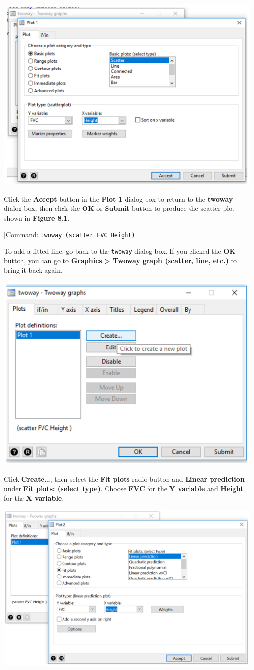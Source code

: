 \documentclass[
]{memoir}
\begin{document}
\includegraphics[width=0.66\linewidth]{img/mod08/stata/twoway-2}

Click the \textbf{Accept} button in the \textbf{Plot 1} dialog box to return to the \textbf{twoway} dialog box, then click the \textbf{OK} or \textbf{Submit} button to produce the scatter plot shown in \textbf{Figure 8.1}.

{[}Command: \texttt{twoway\ (scatter\ FVC\ Height)}{]}

To add a fitted line, go back to the \texttt{twoway} dialog box. If you clicked the \textbf{OK} button, you can go to \textbf{Graphics} \textbf{\textgreater{} Twoway} \textbf{graph (scatter, line, etc.)} to bring it back again.

\includegraphics[width=0.66\linewidth]{img/mod08/stata/twoway-3}

Click \textbf{Create\ldots{}}, then select the \textbf{Fit plots} radio button and \textbf{Linear prediction} under \textbf{Fit plots: (select type)}. Choose \textbf{FVC} for the \textbf{Y variable} and \textbf{Height} for the \textbf{X variable}.

\includegraphics[width=0.66\linewidth]{img/mod08/stata/twoway-4}
\end{document}
